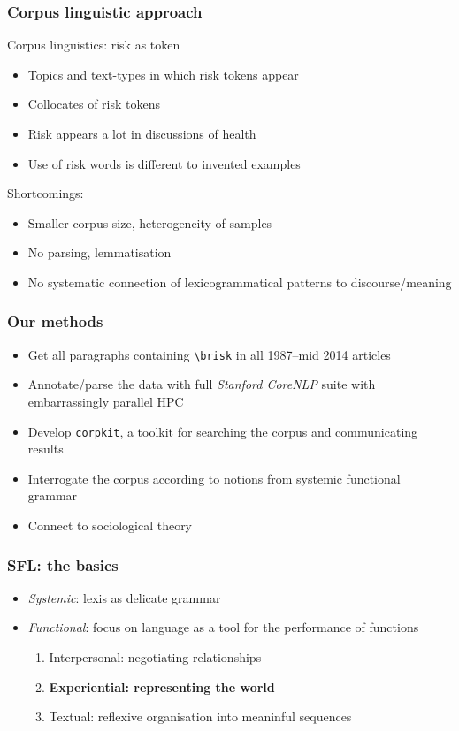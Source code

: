 \documentclass{beamer}       %
\begin{document}
\begin{frame}
    \frametitle{Corpus linguistic approach}

    Corpus linguistics: risk as token \cite{hamilton_meanings_2007}

    \begin{itemize}
    \item Topics and text-types in which risk tokens appear
    \item Collocates of risk tokens
    \item Risk appears a lot in discussions of health
    \item Use of risk words is different to invented examples
    \end{itemize}

    Shortcomings:

    \begin{itemize}
        \item Smaller corpus size, heterogeneity of samples
        \item No parsing, lemmatisation
        \item No systematic connection of lexicogrammatical patterns to discourse\slash meaning
    \end{itemize}

\end{frame}

\begin{frame}
    \frametitle{Our methods}
    
    \begin{itemize}
    \item Get all paragraphs containing \texttt{\textbackslash brisk} in all 1987--mid 2014 articles
    \item Annotate\slash parse the data with full \emph{Stanford CoreNLP} suite with embarrassingly parallel HPC
    \item Develop \texttt{corpkit}, a toolkit for searching the corpus and communicating results
    \item Interrogate the corpus according to notions from systemic functional grammar
    \item Connect to sociological theory
    \end{itemize}
\end{frame}

\begin{frame}
\frametitle{SFL: the basics}
\begin{itemize}
\item \emph{Systemic}: lexis as delicate grammar
\item \emph{Functional}: focus on language as a tool for the performance of functions
\begin{enumerate}
    \item Interpersonal: negotiating relationships
    \item \textbf{Experiential: representing the world}
    \item Textual: reflexive organisation into meaninful sequences
\end{enumerate}
\end{itemize}
\end{frame}
\end{document}

